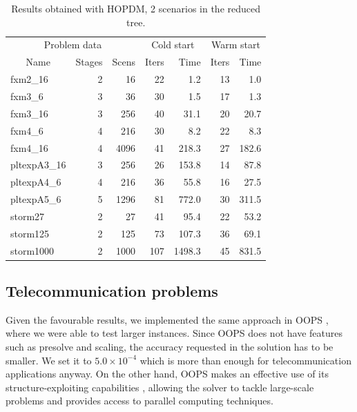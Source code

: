 \begin{table}[ht]
  \begin{center}
    \begin{tabular}{|l|r|r||r|r||r|r|} \hline
      \multicolumn{3}{|c||}{Problem data}&\multicolumn{2}{c||}{Cold start}&\multicolumn{2}{c|}{Warm start}\\
      \multicolumn{1}{|c|}{Name} & Stages & Scens & Iters & Time & Iters & Time \\ \hline \hline
fxm2\_16     &  2 &   16 &  22 &   1.2 & 13 &   1.0 \\
fxm3\_6      &  3 &   36 &  30 &   1.5 & 17 &   1.3 \\
fxm3\_16     &  3 &  256 &  40 &  31.1 & 20 &  20.7 \\
fxm4\_6      &  4 &  216 &  30 &   8.2 & 22 &   8.3 \\
fxm4\_16     &  4 & 4096 &  41 & 218.3 & 27 & 182.6 \\ \hline
pltexpA3\_16 &  3 &  256 &  26 & 153.8 & 14 &  87.8 \\
pltexpA4\_6  &  4 &  216 &  36 &  55.8 & 16 &  27.5 \\
pltexpA5\_6  &  5 & 1296 &  81 & 772.0 & 30 & 311.5 \\ \hline
storm27      &  2 &   27 &  41 &  95.4 & 22 &  53.2 \\
storm125     &  2 &  125 &  73 & 107.3 & 36 &  69.1 \\
storm1000    &  2 & 1000 & 107 &1498.3 & 45 & 831.5 \\ \hline
    \end{tabular}
    \caption{Results obtained with HOPDM, 2 scenarios in the reduced tree.}
    \label{table:hopdm}
  \end{center} \vspace{-3ex}
\end{table}

%
%
\subsection{Telecommunication problems}

Given the favourable results, we implemented the same approach 
in OOPS \cite{GondzioSarkissian,GondzioGrothey04}, where we were 
able to test larger instances. 
Since OOPS does not have features such as presolve and scaling,
the accuracy requested in the solution has to be smaller. We set it to
$5.0 \times 10^{-4}$ which is more than enough for telecommunication
applications anyway.
On the other hand, OOPS makes an effective use of its structure-exploiting
capabilities \cite{GondzioSarkissian,GondzioGrothey04},
allowing the solver to tackle large-scale problems 
and provides access to parallel computing techniques.

